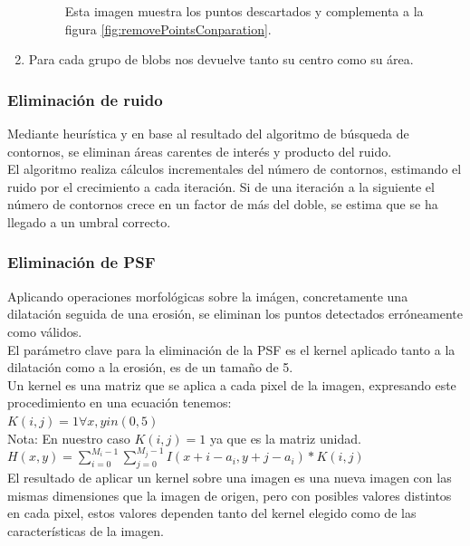\begin{enumerate}
\begin{figure}[!htb]
				\caption{\label{fig:removePointsDiference}Esta imagen muestra los puntos descartados y complementa a la figura \ref{fig:removePointsConparation}.}
			\end{figure}		
		\item Para cada grupo de blobs nos devuelve tanto su centro como su área.
	\end{enumerate}

	\subsubsection{Eliminación de ruido}
	Mediante heurística y en base al resultado del algoritmo de búsqueda de contornos, se eliminan áreas carentes de interés y producto del ruido.
	\\El algoritmo realiza cálculos incrementales del número de contornos, estimando el ruido por el crecimiento a cada iteración. Si de una iteración a la siguiente el número de contornos crece en un factor de más del doble, se estima que se ha llegado a un umbral correcto. 
	\subsubsection{Eliminación de PSF}
    Aplicando operaciones morfológicas sobre la imágen, concretamente una dilatación seguida de una erosión, se eliminan los puntos detectados erróneamente como válidos.
    \\
    El parámetro clave para la eliminación de la PSF es el kernel aplicado tanto a la dilatación como a la erosión, es de un tamaño de 5.
    \\
    Un kernel es una matriz que se aplica a cada pixel de la imagen, expresando este procedimiento en una ecuación tenemos:\\ \newline
    $ K(i,j) = 1 \forall x,y in (0,5)$\\ \newline
    \scriptsize Nota: En nuestro caso $K(i,j)=1$ ya que es la matriz unidad.\\ \newline
    $ H(x,y) = \sum_{i=0}^{M_{i}-1}\sum_{j=0}^{M_{j}-1}I(x+i-a_{i},y+j-a_{i})*K(i,j) $
	\\
	El resultado de aplicar un kernel sobre una imagen es una nueva imagen con las mismas dimensiones que la imagen de origen, pero con posibles valores distintos en cada pixel, estos valores dependen tanto del kernel elegido como de las características de la imagen.
	\\
